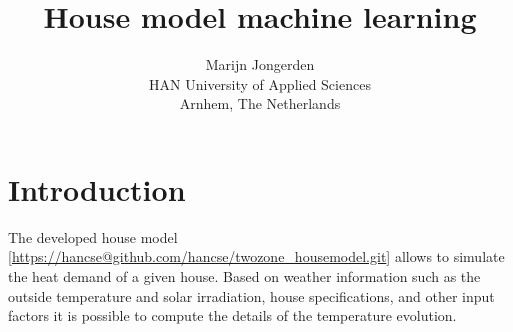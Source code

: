 

\title{House model machine learning}
\author{Marijn Jongerden\\
HAN University of Applied Sciences\\
Arnhem, The Netherlands}


	
\ldf  %


\ldf

\maketitle





\section{Introduction}\label{s:introduction}
The developed house model [\url{https://hancse@github.com/hancse/twozone_housemodel.git}] allows to simulate the heat demand of a given house. Based on weather information such as the outside temperature and solar irradiation, house specifications, and other input factors it is possible to compute the details of the temperature evolution. 

